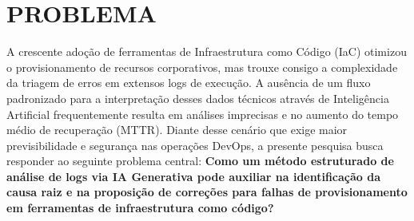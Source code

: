 \section{PROBLEMA}

A crescente adoção de ferramentas de Infraestrutura como Código (IaC) otimizou o provisionamento de recursos corporativos, mas trouxe consigo a complexidade da triagem de erros em extensos logs de execução. A ausência de um fluxo padronizado para a interpretação desses dados técnicos através de Inteligência Artificial frequentemente resulta em análises imprecisas e no aumento do tempo médio de recuperação (MTTR). Diante desse cenário que exige maior previsibilidade e segurança nas operações DevOps, a presente pesquisa busca responder ao seguinte problema central: \textbf{Como um método estruturado de análise de logs via IA Generativa pode auxiliar na identificação da causa raiz e na proposição de correções para falhas de provisionamento em ferramentas de infraestrutura como código?}
